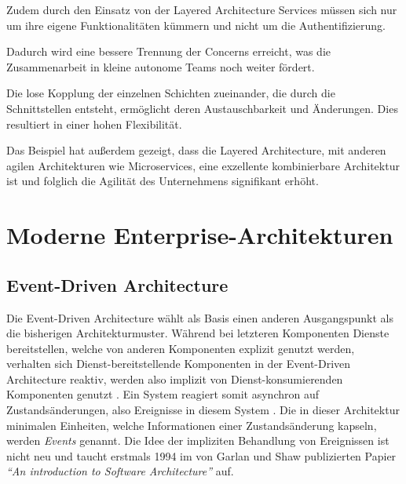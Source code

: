 \documentclass[acmtog]{acmart}
\begin{document}
Zudem durch den Einsatz von der Layered Architecture Services müssen sich nur
 um ihre eigene Funktionalitäten kümmern und nicht um die Authentifizierung.

Dadurch wird eine bessere Trennung der Concerns erreicht, was die Zusammenarbeit
 in kleine autonome Teams noch weiter fördert.

Die lose Kopplung der einzelnen Schichten zueinander, die durch die Schnittstellen entsteht,
ermöglicht deren Austauschbarkeit und Änderungen.
Dies resultiert in einer hohen Flexibilität.

Das Beispiel hat außerdem gezeigt, dass die Layered Architecture, mit anderen agilen
Architekturen wie Microservices, eine exzellente kombinierbare Architektur ist und
folglich die Agilität des Unternehmens signifikant erhöht.

\section{Moderne Enterprise-Architekturen}

\subsection{Event-Driven Architecture}
Die Event-Driven Architecture wählt als Basis einen anderen Ausgangspunkt als die bisherigen Architekturmuster.
Während bei letzteren Komponenten Dienste bereitstellen, welche von anderen Komponenten explizit genutzt werden,
verhalten sich Dienst-bereitstellende Komponenten in der Event-Driven Architecture reaktiv,
werden also implizit von Dienst-konsumierenden Komponenten genutzt \cite{garlanShawImplizit}.
Ein System reagiert somit asynchron auf Zustandsänderungen, also Ereignisse in diesem System \cite{eda}.
Die in dieser Architektur minimalen Einheiten, welche Informationen einer Zustandsänderung kapseln, werden \textit{Events} genannt.
Die Idee der impliziten Behandlung von Ereignissen ist nicht neu und taucht erstmals 1994 im von Garlan und Shaw publizierten Papier
\textit{\enquote{An introduction to Software Architecture}} auf.
\end{document}

